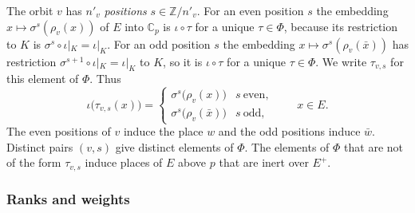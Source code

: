 The orbit $v$ has $n'_v$ \emph{positions} $s\in\mathbb Z/n'_v$. For an even position $s$ the embedding $x\mapsto\sigma^s(\rho_v(x))$ of $E$ into $\mathbb C_p$ is $\iota\circ\tau$ for a unique $\tau\in\Phi$, because its restriction to $K$ is $\sigma^s\circ\iota|_K=\iota|_K$. For an odd position $s$ the embedding $x\mapsto\sigma^s(\rho_v(\bar x))$ has restriction $\sigma^{s+1}\circ\iota|_K=\iota|_K$ to $K$, so it is $\iota\circ\tau$ for a unique $\tau\in\Phi$. We write $\tau_{v,s}$ for this element of $\Phi$. Thus
\begin{equation}\label{r1:eq:pos}
\iota\big(\tau_{v,s}(x)\big)=\begin{cases}\sigma^s\big(\rho_v(x)\big)&s\ \text{even},\\ \sigma^s\big(\rho_v(\bar x)\big)&s\ \text{odd},\end{cases}\qquad x\in E .
\end{equation}
The even positions of $v$ induce the place $w$ and the odd positions induce $\bar w$. Distinct pairs $(v,s)$ give distinct elements of $\Phi$. The elements of $\Phi$ that are not of the form $\tau_{v,s}$ induce places of $E$ above $p$ that are inert over $E^+$.

\subsubsection{Ranks and weights}

